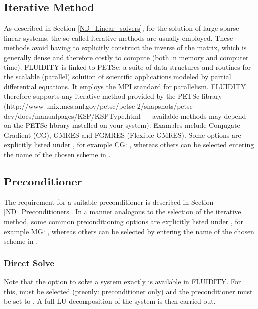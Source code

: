 \subsection{Iterative Method}
As described in Section \ref{ND_Linear_solvers}, for the solution of large sparse linear systems, the so called iterative methods are usually employed. These methods avoid having to explicitly construct the inverse of the matrix, which is generally dense and therefore costly to compute (both in memory and computer time). FLUIDITY is linked to PETSc: a suite of data structures and routines for the scalable (parallel) solution of scientific applications modeled by partial differential equations.  It employs the MPI standard for parallelism. FLUIDITY therefore supports any iterative method provided by the PETSc library (http://www-unix.mcs.anl.gov/petsc/petsc-2/snapshots/petsc-dev/docs/manualpages/KSP/KSPType.html --- available methods may depend on the PETSc library installed on your system). Examples include Conjugate Gradient (CG), GMRES and FGMRES (Flexible GMRES). Some options are explicitly listed under , for example CG: , whereas others can be selected entering the name of the chosen scheme in .

\subsection{Preconditioner}

The requirement for a suitable preconditioner is described in Section \ref{ND_Preconditioners}. In a manner analogous to the selection of the iterative method, some common preconditioning options are explicitly listed under , for example MG: , whereas others can be selected by entering the name of the chosen scheme in . 

\subsubsection{Direct Solve}

Note that the option to solve a system exactly is available in FLUIDITY. For this,  must be selected (preonly: preconditioner only) and the preconditioner must be set to . A full LU decomposition of the system is then carried out.

